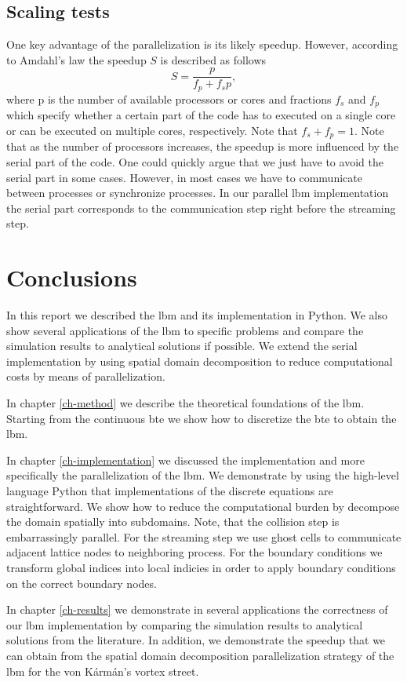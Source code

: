 \documentclass[a4paper,11pt, footsepline]{book}
\begin{document}
\section{Scaling tests}\label{sec-scaling}
One key advantage of the parallelization is its likely speedup. However, according to Amdahl's law \cite{Amdahl.1967} the speedup $S$ is described as follows
\begin{equation}
S=\frac{p}{f_{p}+f_{s}p},
\end{equation}
where p is the number of available processors or cores and fractions $f_{s}$ and $f_{p}$ which specify whether a certain part of the code has to executed on a single core or can be executed on multiple cores, respectively. Note that $f_{s}+f_{p}=1$. Note that as the number of processors increases, the speedup is more influenced by the serial part of the code. One could quickly argue that we just have to avoid the serial part in some cases. However, in most cases we have to communicate between processes or synchronize processes. In our parallel \ac{lbm} implementation the serial part corresponds to the communication step right before the streaming step.
\chapter{Conclusions}\label{ch-conclusion}
In this report we described the \ac{lbm} and its implementation in Python. We also show several applications of the \ac{lbm} to specific problems and compare the simulation results to analytical solutions if possible. We extend the serial implementation by using spatial domain decomposition to reduce computational costs by means of parallelization.

In chapter \ref{ch-method} we describe the theoretical foundations of the \ac{lbm}. Starting from the continuous \ac{bte} we show how to discretize the \ac{bte} to obtain the \ac{lbm}.

In chapter \ref{ch-implementation} we discussed the implementation and more specifically the parallelization of the \ac{lbm}. We demonstrate by using the high-level language Python that implementations of the discrete equations are straightforward. We show how to reduce the computational burden by decompose the domain spatially into subdomains. Note, that the collision step is embarrassingly parallel. For the streaming step we use ghost cells to communicate adjacent lattice nodes to neighboring process. For the boundary conditions we transform global indices into local indicies in order to apply boundary conditions on the correct boundary nodes.

In chapter \ref{ch-results} we demonstrate in several applications the correctness of our \ac{lbm} implementation by comparing the simulation results to analytical solutions from the literature. In addition, we demonstrate the speedup that we can obtain from the spatial domain decomposition parallelization strategy of the \ac{lbm} for the von K\'{a}rm\'{a}n's vortex street.

\newpage



\end{document}
